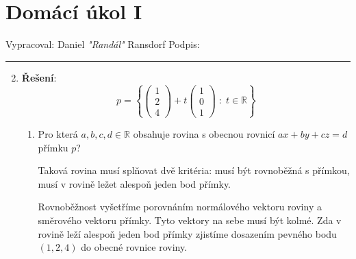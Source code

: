 \documentclass[12pt]{article}
\begin{document}
\section*{Domácí úkol I}

Vypracoval: Daniel \textit{"Randál"} Ransdorf \hfill Podpis: \rule{4cm}{0.4pt}

\begin{enumerate}
  \setcounter{enumi}{1}
  \item \textbf{Řešení}:
    \[
    p = \left\{ 
      \begin{pmatrix} 1 \\ 2 \\ 4 \end{pmatrix} 
      + t \begin{pmatrix} 1 \\ 0 \\ 1 \end{pmatrix} 
      \;:\; t \in \mathbb{R}
    \right\}
    \]
    \begin{enumerate}
      \item Pro která $a,b,c,d \in \mathbb{R}$ obsahuje rovina s obecnou rovnicí $ax+by+cz=d$ přímku $p$?

        Taková rovina musí splňovat dvě kritéria: musí být rovnoběžná s přímkou, musí v rovině ležet alespoň jeden bod přímky.
        
        Rovnoběžnost vyšetříme porovnáním normálového vektoru roviny a směrového vektoru přímky.
        Tyto vektory na sebe musí být kolmé. Zda v rovině leží alespoň jeden bod přímky
        zjistíme dosazením pevného bodu $(1,2,4)$ do obecné rovnice roviny.


\end{enumerate}
\end{enumerate}
\end{document}

